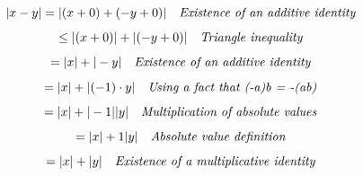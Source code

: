 \documentclass{article}
\begin{document}
\begin{equation*}
	|x - y| = |(x + 0) + (-y + 0)| \ \ \ \emph{Existence of an additive identity}
\end{equation*}
\begin{equation*}
	\leq |(x + 0)| + |(-y + 0)| \ \ \ \emph{Triangle inequality}
\end{equation*}
\begin{equation*}
	= |x| + |-y| \ \ \ \emph{Existence of an additive identity}
\end{equation*}
\begin{equation*}
	= |x| + |(-1) \cdot y| \ \ \ \emph{Using a fact that (-a)b = -(ab)}
\end{equation*}
\begin{equation*}
	= |x| + |-1||y| \ \ \ \emph{Multiplication of absolute values}
\end{equation*}
\begin{equation*}
	= |x| + 1|y| \ \ \ \emph{Absolute value definition}
\end{equation*}
\begin{equation*}
	= |x| + |y| \ \ \ \emph{Existence of a multiplicative identity}
\end{equation*}
\end{document}
